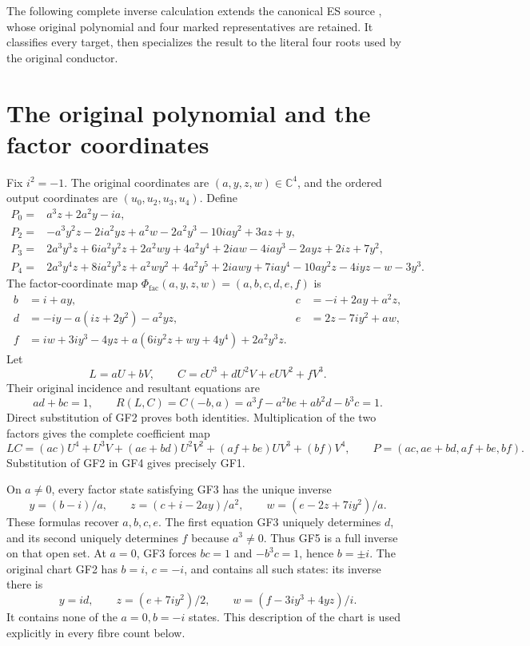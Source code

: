 \documentclass[11pt]{article}
\newcommand{\C}{\mathbb C}
\begin{document}
\providecommand{\cP}{\mathcal P}
The following complete inverse calculation extends the canonical ES source
\cite{ES488}, whose original polynomial and four marked representatives
are retained. It classifies every target, then specializes the result
to the literal four roots used by the original conductor.

\section{The original polynomial and the factor coordinates}
Fix $i^2=-1$. The original coordinates are $(a,y,z,w)\in\C^4$,
and the ordered output coordinates are $(u_0,u_2,u_3,u_4)$. Define
\begin{align}
 P_0={}&a^3z+2a^2y-ia,\nonumber\\
 P_2={}&-a^3y^2z-2ia^2yz+a^2w-2a^2y^3-10iay^2+3az+y,\nonumber\\
 P_3={}&2a^3y^3z+6ia^2y^2z+2a^2wy+4a^2y^4+2iaw
       -4iay^3-2ayz+2iz+7y^2,\nonumber\\
 P_4={}&2a^3y^4z+8ia^2y^3z+a^2wy^2+4a^2y^5+2iawy
       +7iay^4-10ay^2z-4iyz-w-3y^3.
 \tag{GF1}
\end{align}
The factor-coordinate map $\Phi_{\mathrm{fac}}(a,y,z,w)=(a,b,c,d,e,f)$ is
\begin{align}
 b&=i+ay,&c&=-i+2ay+a^2z,\nonumber\\
 d&=-iy-a(iz+2y^2)-a^2yz,&e&=2z-7iy^2+aw,\nonumber\\
 f&=iw+3iy^3-4yz+a(6iy^2z+wy+4y^4)+2a^2y^3z.
 &&\tag{GF2}
\end{align}
Let
\[
 L=aU+bV,\qquad C=cU^3+dU^2V+eUV^2+fV^3.
\]
Their original incidence and resultant equations are
\begin{equation}
 ad+bc=1,\qquad
 R(L,C)=C(-b,a)=a^3f-a^2be+ab^2d-b^3c=1.\tag{GF3}
\end{equation}
Direct substitution of GF2 proves both identities. Multiplication
of the two factors gives the complete coefficient map
\begin{equation}
 LC=(ac)U^4+U^3V+(ae+bd)U^2V^2+(af+be)UV^3+(bf)V^4,
 \qquad P=(ac,ae+bd,af+be,bf).\tag{GF4}
\end{equation}
Substitution of GF2 in GF4 gives precisely GF1.

On $a\ne0$, every factor state satisfying GF3 has the unique inverse
\begin{equation}
 y=(b-i)/a,\qquad z=(c+i-2ay)/a^2,\qquad
 w=(e-2z+7iy^2)/a.\tag{GF5}
\end{equation}
These formulas recover $a,b,c,e$. The first equation GF3 uniquely
determines $d$, and its second uniquely determines $f$ because
$a^3\ne0$. Thus GF5 is a full inverse on that open set.
At $a=0$, GF3 forces $bc=1$ and $-b^3c=1$, hence $b=\pm i$.
The original chart GF2 has $b=i$, $c=-i$, and contains all such
states: its inverse there is
\[
 y=id,\qquad z=(e+7iy^2)/2,\qquad
 w=(f-3iy^3+4yz)/i.
\]
It contains none of the $a=0,b=-i$ states. This description of the
chart is used explicitly in every fibre count below.
\end{document}
